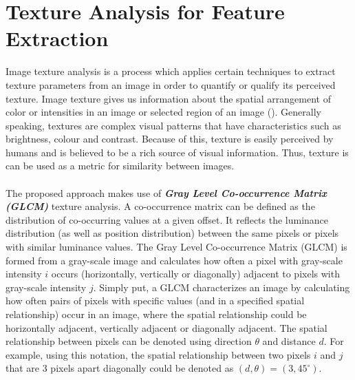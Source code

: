 \section{Texture Analysis for Feature Extraction}
Image texture analysis is a process which applies certain techniques to extract texture parameters from an image in order to quantify or qualify its perceived texture. Image texture gives us information about the spatial arrangement of color or intensities in an image or selected region of an image (\cite{REF21}). Generally speaking, textures are complex visual patterns that have characteristics such as brightness, colour and contrast. Because of this, texture is easily perceived by humans and is believed to be a rich source of visual information. Thus, texture is can be used as a metric for similarity between images.\\ \\
%
The proposed approach makes use of \textbf{\textit{Gray Level Co-occurrence Matrix (GLCM)}} texture analysis. A co-occurrence matrix can be defined as the distribution of co-occurring values at a given offset. It reflects the luminance distribution (as well as position distribution) between the same pixels or pixels with similar luminance values. The Gray Level Co-occurrence Matrix (GLCM) is formed from a gray-scale image and calculates how often a pixel with gray-scale intensity $i$ occurs (horizontally, vertically or diagonally) adjacent to pixels with gray-scale intensity $j$. Simply put, a GLCM characterizes an image by calculating how often pairs of pixels with specific values (and in a specified spatial relationship) occur in an image, where the spatial relationship could be horizontally adjacent, vertically adjacent or diagonally adjacent. The spatial relationship between pixels can be denoted using direction $\theta$ and distance $d$. For example, using this notation, the spatial relationship between two pixels $i$ and $j$ that are 3 pixels apart diagonally could be denoted as $(d,\theta) = (3,45^\circ)$.\\ \\

